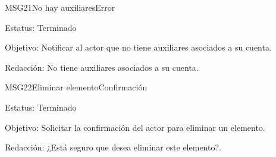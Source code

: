 \begin{mensaje}{MSG21}{No hay auxiliares}{Error}
	\item[Estatus:] Terminado
	\item[Objetivo:] Notificar al actor que no tiene auxiliares asociados a su cuenta.
	\item[Redacción:] No tiene auxiliares asociados a su cuenta.
\end{mensaje}

\begin{mensaje}{MSG22}{Eliminar elemento}{Confirmación}
	\item[Estatus:] Terminado
	\item[Objetivo:] Solicitar la confirmación del actor para eliminar un elemento.
	\item[Redacción:] ¿Está seguro que desea eliminar este elemento?.
\end{mensaje}

